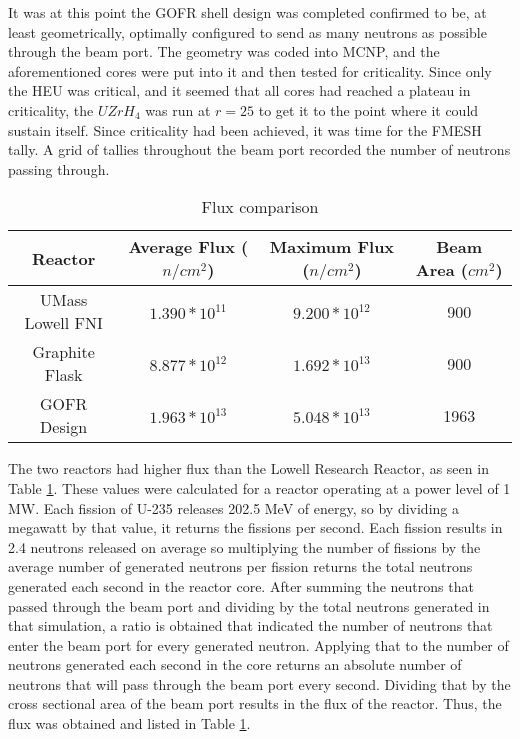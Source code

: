 It was at this point the GOFR shell design was completed confirmed to be, at least geometrically, optimally configured to send as many neutrons as possible through the beam port. The geometry was coded into MCNP, and the aforementioned cores were put into it and then tested for criticality. Since only the HEU was critical, and it seemed that all cores had reached a plateau in criticality, the $UZrH_4$ was run at $r=25$ to get it to the point where it could sustain itself. Since criticality had been achieved, it was time for the FMESH tally. A grid of tallies throughout the beam port recorded the number of neutrons passing through. 

\begin{table}[!htbp]
\centering
\caption{Flux comparison}
\label{tab:flux}
\begin{tabular}{|c|c|c|c|}
\hline
Reactor			& Average Flux ($n/cm^2$)		& Maximum Flux ($n/cm^2$) & Beam Area ($cm^2$) \\
\hline
UMass Lowell FNI  	        & $1.390*10^11$           & $9.200*10^12$   &  900		\\
\hline
Graphite Flask				& $8.877*10^12$           & $1.692*10^13$   &  900		\\
\hline
GOFR Design 				& $1.963*10^13$           & $5.048*10^13$   & 1963		\\
\hline
\end{tabular}
\end{table}

The two reactors had higher flux than the Lowell Research Reactor, as seen in Table \ref{tab:flux}. These values were calculated for a reactor operating at a power level of 1 MW. Each fission of U-235 releases 202.5 MeV of energy, so by dividing a megawatt by that value, it returns the fissions per second. Each fission results in 2.4 neutrons released on average so multiplying the number of fissions by the average number of generated neutrons per fission returns the total neutrons generated each second in the reactor core. After summing the neutrons that passed through the beam port and dividing by the total neutrons generated in that simulation, a ratio is obtained that indicated the number of neutrons that enter the beam port for every generated neutron. Applying that to the number of neutrons generated each second in the core returns an absolute number of neutrons that will pass through the beam port every second. Dividing that by the cross sectional area of the beam port results in the flux of the reactor. Thus, the flux was obtained and listed in Table \ref{tab:flux}.\\

